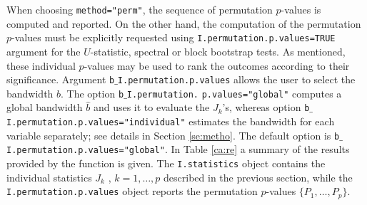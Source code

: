 When choosing \texttt{method="perm"}, the sequence of permutation $p$-values is computed and reported. On the other hand, the computation of the permutation $p$-values must be explicitly requested using \texttt{I.permutation.p.values=TRUE} argument for the $U$-statistic, spectral or block bootstrap tests.  As mentioned, these individual $p$-values may be used to rank the outcomes according to their significance. Argument \texttt{b$\_$I.permutation.p.values} allows the user to select the bandwidth $b$. The option \texttt{b$\_$I.permutation.} \texttt{p.values="global"} computes a global bandwidth $\widehat{b}$ and uses it to evaluate the $J_k$'s, whereas option \texttt{b$\_$I.permutation.p.values="individual"} 
estimates the bandwidth  for each variable separately; see details in Section \ref{se:metho}. The default option is \texttt{b$\_$I.permutation.p.values="global"}. In Table \ref{ca:re} a summary of the results provided by the function  is given. The \texttt{I.statistics}
object contains the individual statistics $J_k$ , $k = 1, \dots, p$ described in the previous section, while the \texttt{I.permutation.p.values} object reports the 
permutation $p$-values $\{P_1,
\ldots, P_p\}$.



